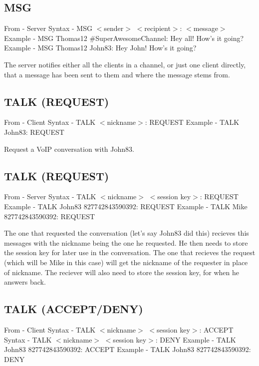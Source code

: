 \documentclass[12pt]{rapport}
\begin{document}
\subsection*{MSG}
From    - Server\newline
Syntax  - MSG $<$sender$>$ $<$recipient$>$: $<$message$>$\newline
Example - MSG Thomas12 \#SuperAwesomeChannel: Hey all! How's it going?\newline
Example - MSG Thomas12 John83: Hey John! How's it going?\newline

\noindent The server notifies either all the clients in a channel, or just one client directly, that a message has been sent to them and where the message stems from.

\subsection*{TALK (REQUEST)}
From    - Client\newline
Syntax  - TALK $<$nickname$>$: REQUEST\newline
Example - TALK John83: REQUEST\newline

\noindent Request a VoIP conversation with John83.

\subsection*{TALK (REQUEST)}
From    - Server\newline
Syntax  - TALK $<$nickname$>$ $<$session key$>$: REQUEST\newline
Example - TALK John83 827742843590392: REQUEST\newline
Example - TALK Mike 827742843590392: REQUEST\newline

\noindent The one that requested the conversation (let's say John83 did this) recieves this messages with the nickname being the one he requested. He then needs to store the session key for later use in the conversation.\newline
\noindent The one that recieves the request (which will be Mike in this case) will get the nickname of the requester in place of nickname. The reciever will also need to store the session key, for when he answers back.

\subsection*{TALK (ACCEPT/DENY)}
From    - Client\newline
Syntax  - TALK $<$nickname$>$ $<$session key$>$: ACCEPT\newline
Syntax  - TALK $<$nickname$>$ $<$session key$>$: DENY\newline
Example - TALK John83 827742843590392: ACCEPT\newline
Example - TALK John83 827742843590392: DENY\newline
\end{document}
